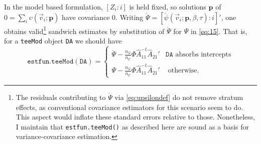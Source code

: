 \documentclass{article}
\newcommand{\absorbInterceptsEF}{\upsilon}
\begin{document}
In the model based formulation, $[Z_{i}: i]$ is held fixed, so
solutions $\hat{\mathbf{p}}$ of
$0 = \sum_{i}\absorbInterceptsEF(\vec{v}_{i}; \mathbf{p})$ have
covariance 0.  Writing $\acute{\Psi} =
[\acute{\psi}(\vec{v}_{i}; \mathbf{p}, \beta, \tau) : i]'$, one
obtains valid\footnote{%
The residuals contributing to $\acute{\Psi}$ via \eqref{eq:upsilondef} do not remove stratum
effects, as conventional covariance estimators for this scenario
seem to do.  This aspect would inflate these standard errors
relative to those. Nonetheless, I maintain that
\texttt{estfun.teeMod()} as described here are sound as a
basis for variance-covariance estimation.}
  sandwich estimates by substitution of $\acute{\Psi}$ for
$\Psi$ in \eqref{eq:15}.  That is, for a
\texttt{teeMod} object \texttt{DA} we should have
\begin{equation*}\label{eq:26}
\mathtt{estfun.teeMod(DA)} = 
  \begin{cases}
  \acute{\Psi} -
  \frac{n_{\mathcal{Q}}}{n_{\mathcal{C}}}\Phi
  \hat{A}_{11}^{-t}\hat{A}_{21}'& \mathtt{DA} \text{ absorbs
    intercepts}\\
\Psi -
  \frac{n_{\mathcal{Q}}}{n_{\mathcal{C}}}\Phi
  \hat{A}_{11}^{-t}\hat{A}_{21}'  & \text{ otherwise}.
\end{cases}
\end{equation*}
\end{document}
